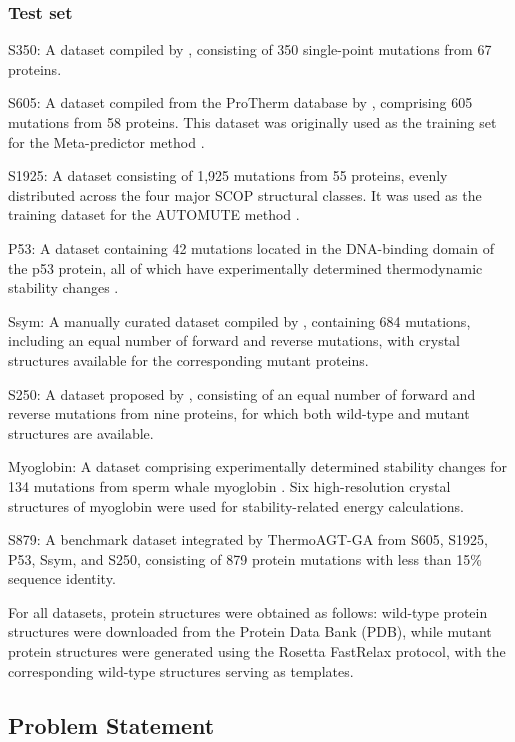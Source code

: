 \documentclass[journal,twoside,web]{ieeecolor}
\begin{document}
\subsubsection{Test set}
\label{subsubsec:testset}

S350: A dataset compiled by \cite{Dehouck2009}, consisting of 350 single-point mutations from 67 proteins.

S605: A dataset compiled from the ProTherm database by \cite{Broom2017}, comprising 605 mutations from 58 proteins. This dataset was originally used as the training set for the Meta-predictor method \cite{Broom2017}.

S1925: A dataset consisting of 1,925 mutations from 55 proteins, evenly distributed across the four major SCOP structural classes. It was used as the training dataset for the AUTOMUTE method \cite{Masso2008}.

P53: A dataset containing 42 mutations located in the DNA-binding domain of the p53 protein, all of which have experimentally determined thermodynamic stability changes \cite{Pires2014_a}.

Ssym: A manually curated dataset compiled by \cite{Pucci2018}, containing 684 mutations, including an equal number of forward and reverse mutations, with crystal structures available for the corresponding mutant proteins.

S250: A dataset proposed by \cite{Fang2020}, consisting of an equal number of forward and reverse mutations from nine proteins, for which both wild-type and mutant structures are available.

Myoglobin: A dataset comprising experimentally determined stability changes for 134 mutations from sperm whale myoglobin \cite{Kepp2015_a}. Six high-resolution crystal structures of myoglobin were used for stability-related energy calculations.

S879: A benchmark dataset integrated by ThermoAGT-GA \cite{Madani2024_a} from S605, S1925, P53, Ssym, and S250, consisting of 879 protein mutations with less than 15\% sequence identity.

For all datasets, protein structures were obtained as follows: wild-type protein structures were downloaded from the Protein Data Bank (PDB), while mutant protein structures were generated using the Rosetta \cite{Alford2017_a} FastRelax protocol, with the corresponding wild-type structures serving as templates.

\subsection{Problem Statement}
\label{subsec:problem}
\end{document}
